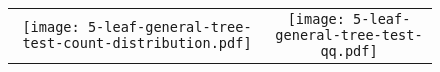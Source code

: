 \documentclass[border=10pt,varwidth=30cm]{standalone}
\begin{document}
\begin{figure}
    \setlength\arrayrulewidth{2pt}
    \centering
    \begin{tabular}{@{}cc@{}}
        \texttt{[image: 5-leaf-general-tree-test-count-distribution.pdf]}
        &
        \texttt{[image: 5-leaf-general-tree-test-qq.pdf]}
        \\
    \end{tabular}
\end{figure}
\end{document}
